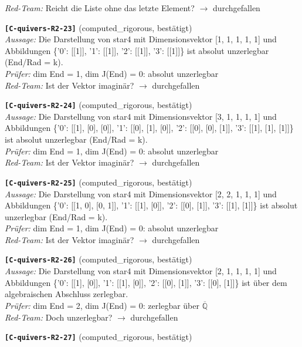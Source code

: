 \documentclass[11pt]{article}
\theoremstyle{definition}\newtheorem{definition}[theorem]{Definition}\newtheorem{remark}[theorem]{Remark}\newtheorem{observation}[theorem]{Numerical observation}
\begin{document}
\textit{Red-Team:} Reicht die Liste ohne das letzte Element? $\to$ durchgefallen\par\medskip
\noindent\textbf{\texttt{[C-quivers-R2-23]}} (computed\_rigorous, bestätigt)\\
\textit{Aussage:} Die Darstellung von star4 mit Dimensionsvektor [1, 1, 1, 1, 1] und Abbildungen \{'0': [[1]], '1': [[1]], '2': [[1]], '3': [[1]]\} ist absolut unzerlegbar (End/Rad = k).\\
\textit{Prüfer:} dim End = 1, dim J(End) = 0: absolut unzerlegbar\\
\textit{Red-Team:} Ist der Vektor imaginär? $\to$ durchgefallen\par\medskip
\noindent\textbf{\texttt{[C-quivers-R2-24]}} (computed\_rigorous, bestätigt)\\
\textit{Aussage:} Die Darstellung von star4 mit Dimensionsvektor [3, 1, 1, 1, 1] und Abbildungen \{'0': [[1], [0], [0]], '1': [[0], [1], [0]], '2': [[0], [0], [1]], '3': [[1], [1], [1]]\} ist absolut unzerlegbar (End/Rad = k).\\
\textit{Prüfer:} dim End = 1, dim J(End) = 0: absolut unzerlegbar\\
\textit{Red-Team:} Ist der Vektor imaginär? $\to$ durchgefallen\par\medskip
\noindent\textbf{\texttt{[C-quivers-R2-25]}} (computed\_rigorous, bestätigt)\\
\textit{Aussage:} Die Darstellung von star4 mit Dimensionsvektor [2, 2, 1, 1, 1] und Abbildungen \{'0': [[1, 0], [0, 1]], '1': [[1], [0]], '2': [[0], [1]], '3': [[1], [1]]\} ist absolut unzerlegbar (End/Rad = k).\\
\textit{Prüfer:} dim End = 1, dim J(End) = 0: absolut unzerlegbar\\
\textit{Red-Team:} Ist der Vektor imaginär? $\to$ durchgefallen\par\medskip
\noindent\textbf{\texttt{[C-quivers-R2-26]}} (computed\_rigorous, bestätigt)\\
\textit{Aussage:} Die Darstellung von star4 mit Dimensionsvektor [2, 1, 1, 1, 1] und Abbildungen \{'0': [[1], [0]], '1': [[1], [0]], '2': [[0], [1]], '3': [[0], [1]]\} ist über dem algebraischen Abschluss zerlegbar.\\
\textit{Prüfer:} dim End = 2, dim J(End) = 0: zerlegbar über $\overline{\mathbb Q}$\\
\textit{Red-Team:} Doch unzerlegbar? $\to$ durchgefallen\par\medskip
\noindent\textbf{\texttt{[C-quivers-R2-27]}} (computed\_rigorous, bestätigt)\\
\end{document}
